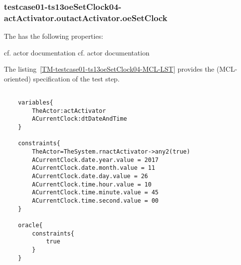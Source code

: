 	\subsubsection{testcase01-ts13oeSetClock04-actActivator.outactActivator.oeSetClock}
	\label{TM-testcase01-ts13oeSetClock04-actActivator.outactActivator.oeSetClock}

	The  has the following properties:

	\begin{teststepmodel}
		
		
		
		
		
		{cf. actor documentation}
		{cf. actor documentation}



	\end{teststepmodel}
	
	
	
		
	\vspace{1cm}
	The listing~\ref{TM-testcase01-ts13oeSetClock04-MCL-LST} provides the \msrmessir (MCL-oriented) specification of the test step.
	
	\scriptsize
	\vspace{0.5cm}
	\begin{lstlisting}[style=MessirStyle,firstnumber=auto,captionpos=b,caption={\msrmessir (MCL-oriented) specification of the test step \emph{testcase01-ts13oeSetClock04}.},label=TM-testcase01-ts13oeSetClock04-MCL-LST]

	variables{
		TheActor:actActivator
		ACurrentClock:dtDateAndTime
	}
	
	constraints{
		TheActor=TheSystem.rnactActivator->any2(true)
		ACurrentClock.date.year.value = 2017
		ACurrentClock.date.month.value = 11
		ACurrentClock.date.day.value = 26
		ACurrentClock.time.hour.value = 10
		ACurrentClock.time.minute.value = 45
		ACurrentClock.time.second.value = 00
	}
	
	oracle{
		constraints{
			true
		}
	}
	
	\end{lstlisting}
	\normalsize 
	
	
